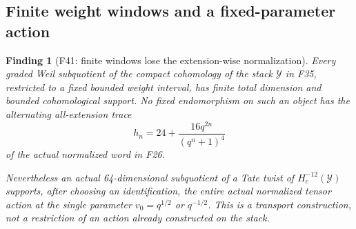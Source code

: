 \documentclass[11pt,a4paper]{article}
\newcommand{\fid}[1]{\textsf{#1}}\newcommand{\gate}[1]{\textsf{#1}}
\theoremstyle{named}\newtheorem{finding}{Finding}[section]
\theoremstyle{definition}\newtheorem{definition}[finding]{Definition}
\theoremstyle{remark}\newtheorem{remark}[finding]{Remark}
\begin{document}
\subsection{Finite weight windows and a fixed-parameter action}
\begin{finding}[\fid{F41}: finite windows lose the extension-wise normalization]\label{f:finitewindow}
Every graded Weil subquotient of the compact cohomology of the
stack $\mathcal Y$ in \fid{F35}, restricted to a fixed bounded
weight interval, has finite total dimension and bounded
cohomological support. No fixed endomorphism on such an object
has the alternating all-extension trace
\[
 h_n=24+\frac{16q^{2n}}{(q^n+1)^4}
\]
of the actual normalized word in \fid{F26}.

Nevertheless an actual 64-dimensional subquotient of a Tate
twist of $H_c^{-12}(\mathcal Y)$ supports, after choosing an
identification, the entire actual normalized tensor action
at the single parameter $v_0=q^{1/2}$ or $q^{-1/2}$.
This is a transport construction, not a restriction of an action
already constructed on the stack.
\end{finding}
\end{document}
